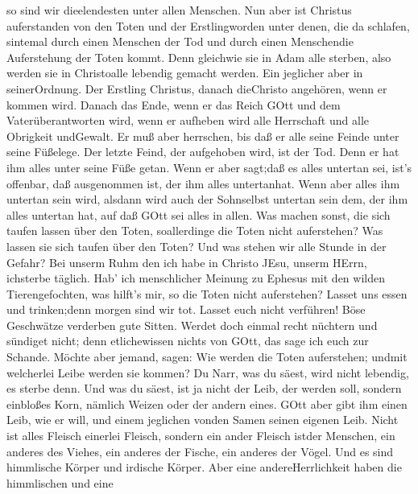 so sind wir dieelendesten unter allen Menschen.  Nun aber
ist Christus auferstanden von den Toten und der Erstlingworden unter
denen, die da schlafen,  sintemal durch einen Menschen der
Tod und durch einen Menschendie Auferstehung der Toten kommt.
 Denn gleichwie sie in Adam alle sterben, also werden sie
in Christoalle lebendig gemacht werden.  Ein jeglicher aber
in seinerOrdnung. Der Erstling Christus, danach dieChristo angehören,
wenn er kommen wird.  Danach das Ende, wenn er das Reich
GOtt und dem Vaterüberantworten wird, wenn er aufheben wird alle
Herrschaft und alle Obrigkeit undGewalt.  Er muß aber
herrschen, bis daß er alle seine Feinde unter seine Füßelege.
 Der letzte Feind, der aufgehoben wird, ist der Tod.
 Denn er hat ihm alles unter seine Füße getan. Wenn er aber
sagt;daß es alles untertan sei, ist's offenbar, daß ausgenommen ist, der
ihm alles untertanhat.  Wenn aber alles ihm untertan sein
wird, alsdann wird auch der Sohnselbst untertan sein dem, der ihm alles
untertan hat, auf daß GOtt sei alles in allen.  Was machen
sonst, die sich taufen lassen über den Toten, soallerdinge die Toten
nicht auferstehen? Was lassen sie sich taufen über den Toten?
 Und was stehen wir alle Stunde in der Gefahr?
 Bei unserm Ruhm den ich habe in Christo JEsu, unserm
HErrn, ichsterbe täglich.  Hab' ich menschlicher Meinung zu
Ephesus mit den wilden Tierengefochten, was hilft's mir, so die Toten
nicht auferstehen? Lasset uns essen und trinken;denn morgen sind wir
tot.  Lasset euch nicht verführen! Böse Geschwätze
verderben gute Sitten.  Werdet doch einmal recht nüchtern
und sündiget nicht; denn etlichewissen nichts von GOtt, das sage ich
euch zur Schande.  Möchte aber jemand, sagen: Wie werden
die Toten auferstehen; undmit welcherlei Leibe werden sie kommen?
 Du Narr, was du säest, wird nicht lebendig, es sterbe
denn.  Und was du säest, ist ja nicht der Leib, der werden
soll, sondern einbloßes Korn, nämlich Weizen oder der andern eines.
 GOtt aber gibt ihm einen Leib, wie er will, und einem
jeglichen vonden Samen seinen eigenen Leib.  Nicht ist
alles Fleisch einerlei Fleisch, sondern ein ander Fleisch istder
Menschen, ein anderes des Viehes, ein anderes der Fische, ein anderes
der Vögel.  Und es sind himmlische Körper und irdische
Körper. Aber eine andereHerrlichkeit haben die himmlischen und eine
